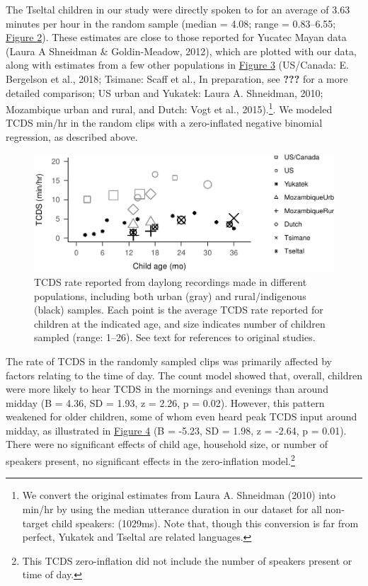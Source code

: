 \documentclass[floatsintext,man]{apa6}
\theoremstyle{definition}
\theoremstyle{definition}
\theoremstyle{definition}
\theoremstyle{remark}
\begin{document}
The Tseltal children in our study were directly spoken to for an average
of 3.63 minutes per hour in the random sample (median = 4.08; range =
0.83--6.55; \protect\hyperlink{fig2}{Figure 2}). These estimates are
close to those reported for Yucatec Mayan data (Laura A Shneidman \&
Goldin-Meadow, 2012), which are plotted with our data, along with
estimates from a few other populations in
\protect\hyperlink{fig3}{Figure 3} (US/Canada: E. Bergelson et al.,
2018; Tsimane: Scaff et al., In preparation, see {\textbf{???}} for a
more detailed comparison; US urban and Yukatek: Laura A. Shneidman,
2010; Mozambique urban and rural, and Dutch: Vogt et al.,
2015).\footnote{We convert the original estimates from Laura A.
  Shneidman (2010) into min/hr by using the median utterance duration in
  our dataset for all non-target child speakers: (1029ms). Note that,
  though this conversion is far from perfect, Yukatek and Tseltal are
  related languages.}. We modeled TCDS min/hr in the random clips with a
zero-inflated negative binomial regression, as described above.

\begin{figure}
\centering
\includegraphics{Tseltal-CLE_files/figure-latex/fig3-1.pdf}
\caption{\label{fig:fig3}TCDS rate reported from daylong recordings made in
different populations, including both urban (gray) and rural/indigenous
(black) samples. Each point is the average TCDS rate reported for
children at the indicated age, and size indicates number of children
sampled (range: 1--26). See text for references to original studies.}
\end{figure}

The rate of TCDS in the randomly sampled clips was primarily affected by
factors relating to the time of day. The count model showed that,
overall, children were more likely to hear TCDS in the mornings and
evenings than around midday (B = 4.36, SD = 1.93, z = 2.26, p = 0.02).
However, this pattern weakened for older children, some of whom even
heard peak TCDS input around midday, as illustrated in
\protect\hyperlink{fig4}{Figure 4} (B = -5.23, SD = 1.98, z = -2.64, p =
0.01). There were no significant effects of child age, household size,
or number of speakers present, no significant effects in the
zero-inflation model.\footnote{This TCDS zero-inflation did not include
  the number of speakers present or time of day.}
\end{document}

